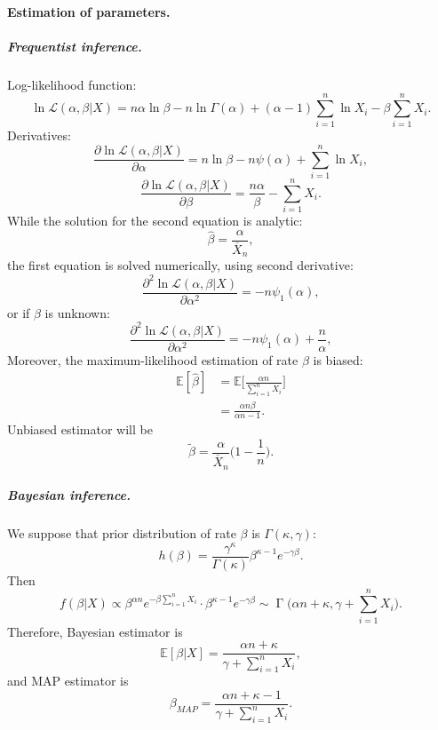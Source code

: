 \documentclass[a4paper,11pt]{article}
\theoremstyle{plain}
\theoremstyle{definition}
\begin{document}
	\paragraph{Estimation of parameters.}
	\subparagraph{Frequentist inference.} Log-likelihood function:
	\[
	\ln \mathcal{L}(\alpha, \beta|X) =  n \alpha \ln \beta - n \ln \Gamma(\alpha) + (\alpha - 1) \sum_{i=1}^{n} \ln X_i - \beta \sum_{i=1}^{n} X_i.
	\]
	Derivatives:
	\[
	\frac{\partial \ln \mathcal{L}(\alpha, \beta | X) }{\partial \alpha} = n \ln \beta - n \psi (\alpha) + \sum_{i=1}^{n} \ln X_i,
	\]
	\[
	\frac{\partial \ln \mathcal{L}(\alpha, \beta | X) }{\partial \beta} = \frac{n \alpha}{\beta} - \sum_{i=1}^{n} X_i.
	\]
	While the solution for the second equation is analytic:
	\[
	\hat{\beta} = \frac{\alpha}{\overline{X}_n},
	\]
	the first equation is solved numerically, using second derivative:
	\[
	\frac{\partial^2 \ln \mathcal{L}(\alpha, \beta | X) }{\partial \alpha^2} = - n \psi_1 (\alpha),
	\]
	or if $\beta$ is unknown:
	\[
	\frac{\partial^2 \ln \mathcal{L}(\alpha, \beta | X) }{\partial \alpha^2} = - n \psi_1 (\alpha) + \frac{n}{\alpha},
	\]
	Moreover, the maximum-likelihood estimation of rate $\beta$ is biased:
	\[
	\begin{aligned}
	\mathbb{E}[\hat{\beta}] & = \mathbb{E}\bigg[ \frac{\alpha n }{\sum_{i=1}^{n}X_i} \bigg] \\
	& = \frac{\alpha n \beta}{\alpha n - 1}.
	\end{aligned}
	\]
	Unbiased estimator will be
	\[
	\tilde{\beta} = \frac{\alpha}{\overline{X}_n} \Big(1 - \frac{1}{n}\Big).
	\]
	\subparagraph{Bayesian inference.} We suppose that prior distribution of rate $\beta$ is $\Gamma(\kappa, \gamma)$:
	\[
	h(\beta) = \frac{\gamma^\kappa}{\Gamma(\kappa)} \beta^{\kappa-1}e^{-\gamma \beta}.
	\]
	Then
	\[
	f(\beta | X) \propto \beta^{\alpha n} e^{-\beta \sum_{i=1}^{n} X_i } \cdot \beta^{\kappa-1}e^{-\gamma \beta} \sim \operatorname{\Gamma}\Big(\alpha n + \kappa, \gamma +\sum_{i=1}^{n} X_i \Big).
	\]
	Therefore, Bayesian estimator is
	\[
	\mathbb{E}[\beta|X] = \frac{\alpha n + \kappa}{\gamma +\sum_{i=1}^{n} X_i},
	\]
	and MAP estimator is
	\[
	\beta_{MAP} = \frac{\alpha n + \kappa - 1}{\gamma +\sum_{i=1}^{n} X_i}.
	\]
	
\end{document}
